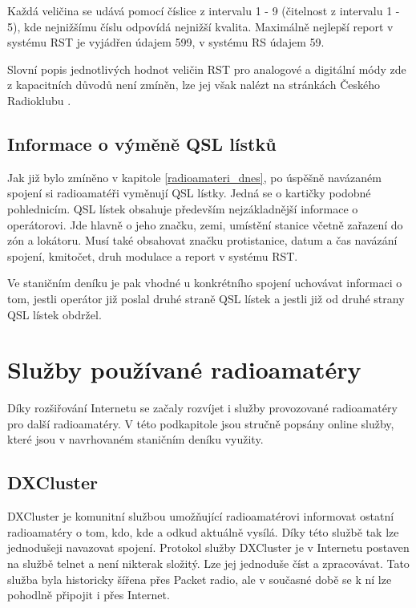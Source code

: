 Každá veličina se udává pomocí číslice z intervalu 1 - 9 (čitelnost z intervalu 1 - 5), kde nejnižšímu číslu odpovídá nejnižší kvalita.
Maximálně nejlepší report v systému RST je vyjádřen údajem 599, v systému RS údajem 59.

Slovní popis jednotlivých hodnot veličin RST pro analogové a digitální módy zde z kapacitních důvodů není zmíněn, lze jej však
nalézt na stránkách Českého Radioklubu \cite{crk_rst}.

\subsection{Informace o výměně QSL lístků}

Jak již bylo zmíněno v kapitole \ref{radioamateri_dnes}, po úspěšně navázaném spojení si radioamatéři vyměnují QSL lístky.
Jedná se o kartičky podobné pohlednicím. QSL lístek obsahuje především nejzákladnější informace o operátorovi.
Jde hlavně o jeho značku, zemi, umístění stanice včetně zařazení do zón a lokátoru.
Musí také obsahovat značku protistanice, datum a čas navázání spojení, kmitočet, druh modulace a report v systému RST. 

Ve staničním deníku je pak vhodné u konkrétního spojení uchovávat informaci o tom, jestli operátor již poslal druhé
straně QSL lístek a jestli již od druhé strany QSL lístek obdržel.


\section{Služby používané radioamatéry}
\label{radioamateri_sluzby}

Díky rozšiřování Internetu se začaly rozvíjet i služby provozované radioamatéry pro další radioamatéry. V této podkapitole
jsou stručně popsány online služby, které jsou v navrhovaném staničním deníku využity.

\subsection{DXCluster}

DXCluster je komunitní službou umožňující radioamatérovi informovat ostatní
radioamatéry o tom, kdo, kde a odkud aktuálně vysílá. Díky této službě tak lze jednodušeji navazovat
spojení. Protokol služby DXCluster je v Internetu postaven na službě telnet a není nikterak
složitý. Lze jej jednoduše číst a zpracovávat. Tato služba byla historicky
šířena přes Packet radio, ale v současné době se k ní lze pohodlně připojit i přes
Internet.

